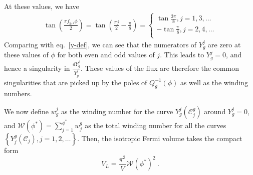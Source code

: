 At these values, we have
\begin{equation}\begin{aligned}
	\tan \left( \frac{\pi f_{g,z} \phi}{2} \right) = \tan \left( \frac{\pi j}{2} - \frac{\pi}{8} \right) = \begin{cases}
	\tan \frac{3\pi}{8}, j=1,3,\ldots\\
	-\tan \frac{\pi}{8}, j=2,4,\ldots\\
\end{cases}
\end{aligned}\end{equation}
Comparing with eq.~\eqref{y-def}, we can see that the numerators of \(Y_g^j\) are zero at these values of \(\phi\) for both even and odd values of \(j\). This leads to \(Y_g^j=0\), and hence a singularity in \(\frac{d Y_g^j}{Y_g^j}\). These values of the flux are therefore the common singularities that are picked up by the poles of \(Q^{-1}_g(\phi)\) as well as the winding numbers.

We now define \(w_g^j\) as the winding number for the curve \(Y_g^j(\mathcal{C}_j^g)\) around \(Y_g^j=0\), and \(\mathcal{W}(\phi^*) = \sum_{j=1}^{\phi^*}w_j^g\) as the total winding number for all the curves \(\left\{Y_j^g\left( \mathcal{C}_j \right), j=1,2,\ldots \right\} \). Then, the isotropic Fermi volume takes the compact form
\begin{equation}
	\label{winding-2}
	V_L = \frac{\pi^3}{V}\mathcal{W}(\phi^*)^2~.
\end{equation}

